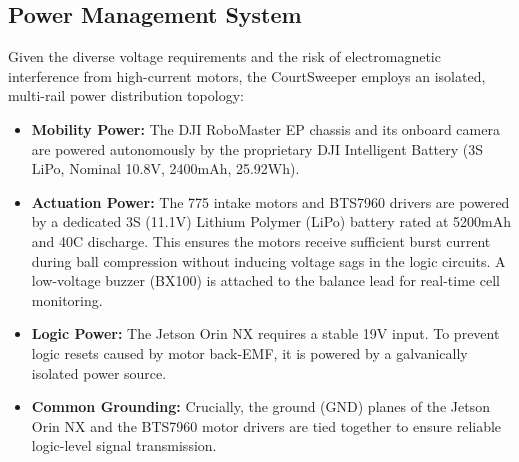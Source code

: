 \subsection{Power Management System}
\label{sec:power_sys}
Given the diverse voltage requirements and the risk of electromagnetic interference from high-current motors, the CourtSweeper employs an isolated, multi-rail power distribution topology:
\begin{itemize}
  \item \textbf{Mobility Power:} The DJI RoboMaster EP chassis and its onboard camera are powered autonomously by the proprietary DJI Intelligent Battery (3S LiPo, Nominal 10.8V, 2400mAh, 25.92Wh).
  \item \textbf{Actuation Power:} The 775 intake motors and BTS7960 drivers are powered by a dedicated 3S (11.1V) Lithium Polymer (LiPo) battery rated at 5200mAh and 40C discharge. This ensures the motors receive sufficient burst current during ball compression without inducing voltage sags in the logic circuits. A low-voltage buzzer (BX100) is attached to the balance lead for real-time cell monitoring.
  \item \textbf{Logic Power:} The Jetson Orin NX requires a stable 19V input. To prevent logic resets caused by motor back-EMF, it is powered by a galvanically isolated power source.
  \item \textbf{Common Grounding:} Crucially, the ground (GND) planes of the Jetson Orin NX and the BTS7960 motor drivers are tied together to ensure reliable logic-level signal transmission.
\end{itemize}